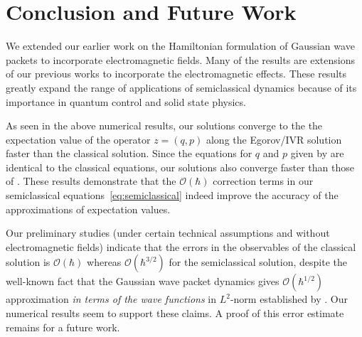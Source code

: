 \documentclass[10pt]{article}
\begin{document}
\section{Conclusion and Future Work}
We extended our earlier work on the Hamiltonian formulation of Gaussian wave packets to incorporate electromagnetic fields.
Many of the results are extensions of our previous works to incorporate the electromagnetic effects.
These results greatly expand the range of applications of semiclassical dynamics because of its importance in quantum control and solid state physics.

As seen in the above numerical results, our solutions converge to the the expectation value of the operator $z = (q,p)$ along the Egorov/IVR solution faster than the classical solution. Since the equations for $q$ and $p$ given by \citet{Zh2014} are identical to the classical equations, our solutions also converge faster than those of \citeauthor{Zh2014}. These results demonstrate that the $\mathcal{O}(\hbar)$ correction terms in our semiclassical equations~\eqref{eq:semiclassical} indeed improve the accuracy of the approximations of expectation values.

Our preliminary studies (under certain technical assumptions and without electromagnetic fields) indicate that the errors in the observables of the classical solution is $\mathcal{O}(\hbar)$ whereas $\mathcal{O}(\hbar^{3/2})$ for the semiclassical solution, despite the well-known fact that the Gaussian wave packet dynamics gives $\mathcal{O}(\hbar^{1/2})$ approximation \textit{in terms of the wave functions} in $L^{2}$-norm established by \citet{Ha1980, Ha1981, Hagedorn1985, Ha1998}.
Our numerical results seem to support these claims.
A proof of this error estimate remains for a future work.




 
\end{document}
